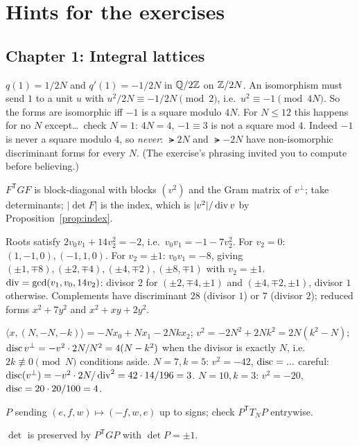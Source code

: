 \chapter{Hints for the exercises}\label{app:hints}

\section*{Chapter 1: Integral lattices}

\begin{description}[leftmargin=1.5em]
\item[1.1] $q(1)=1/2N$ and $q'(1)=-1/2N$ in $\mathbb{Q}/2\mathbb{Z}$ on $\mathbb{Z}/2N$. An isomorphism
  must send $1$ to a unit $u$ with $u^2/2N\equiv-1/2N\pmod 2$, i.e.\
  $u^2\equiv-1\pmod{4N}$. So the forms are isomorphic iff $-1$ is a square
  modulo $4N$. For $N\le12$ this happens for no $N$ except\ldots\ check
  $N=1$: $4N=4$, $-1\equiv3$ is not a square mod $4$. Indeed $-1$ is never a
  square modulo $4$, so \emph{never}: $\lat{2N}$ and $\lat{-2N}$ have
  non-isomorphic discriminant forms for every $N$. (The exercise's phrasing
  invited you to compute before believing.)
\item[1.2] $F^{\mathsf T}GF$ is block-diagonal with blocks $(v^2)$ and the Gram
  matrix of $v^{\perp}$; take determinants; $|\det F|$ is the index, which is
  $|v^2|/\operatorname{div} v$ by Proposition~\ref{prop:index}.
\item[1.3] Roots satisfy $2v_0v_1+14v_2^2=-2$, i.e.\ $v_0v_1=-1-7v_2^2$.
  For $v_2=0$: $(1,-1,0),(-1,1,0)$. For $v_2=\pm1$: $v_0v_1=-8$, giving
  $(\pm1,\mp8),(\pm2,\mp4),(\pm4,\mp2),(\pm8,\mp1)$ with $v_2=\pm1$.
  $\operatorname{div}=\gcd(v_1,v_0,14v_2)$: divisor $2$ for $(\pm2,\mp4,\pm1)$ and
  $(\pm4,\mp2,\pm1)$, divisor $1$ otherwise. Complements have discriminant
  $28$ (divisor $1$) or $7$ (divisor $2$); reduced forms $x^2+7y^2$ and
  $x^2+xy+2y^2$.
\item[1.4] $\langle x,(N,-N,-k)\rangle=-Nx_0+Nx_1-2Nkx_2$; $v^2=-2N^2+2Nk^2=2N(k^2-N)$;
  $\operatorname{disc} v^{\perp}=-v^2\cdot2N/N^2=4(N-k^2)$ when the divisor is exactly $N$,
  i.e.\ $2k\not\equiv0\pmod N$ conditions aside. $N=7,k=5$: $v^2=-42$,
  $\operatorname{disc}=... $ careful: $\operatorname{disc}(v^\perp)=-v^2\cdot 2N/\operatorname{div}^2=42\cdot14/196=3$.
  $N=10,k=3$: $v^2=-20$, $\operatorname{disc}=20\cdot20/100=4$.
\item[1.5] $P$ sending $(e,f,w)\mapsto(-f,w,e)$ up to signs; check
  $P^{\mathsf T}T_NP$ entrywise.
\item[1.6] $\det$ is preserved by $P^{\mathsf T}GP$ with $\det P=\pm1$.
\end{description}

